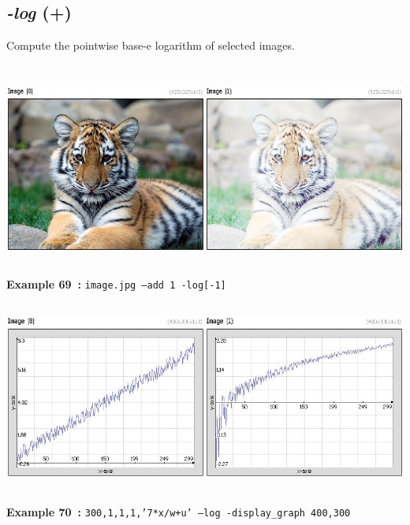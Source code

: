 \documentclass[a4paper,11pt,twoside]{book}
\begin{document}
\subsection{\emph{-log} (+)}\vspace*{-0.5em}
Compute the pointwise base-e logarithm of selected images.
\begin{center}\includegraphics[keepaspectratio=true,height=7cm,width=\textwidth]{img/gmic_def69.jpg}\\
{\footnotesize \textbf{Example 69~:} \texttt{image.jpg --add 1 -log[-1]}}
\\\includegraphics[keepaspectratio=true,height=7cm,width=\textwidth]{img/gmic_def70.jpg}\\
{\footnotesize \textbf{Example 70~:} \texttt{300,1,1,1,'7*x/w+u' --log -display\_graph 400,300}}
\end{center}
\end{document}
